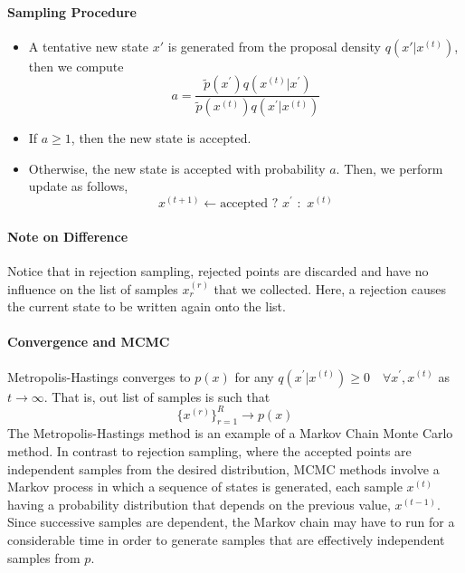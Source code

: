 \documentclass[11pt]{article}
\begin{document}
\paragraph{Sampling Procedure}
\begin{itemize}
    \item A tentative new state $x'$ is generated from the proposal density $q(x'|x^{(t)})$, then we compute
        \begin{equation}
            a=\frac{\tilde{p}\left(x^{\prime}\right) q\left(x^{(t)} | x^{\prime}\right)}{\tilde{p}\left(x^{(t)}\right) q\left(x^{\prime} | x^{(t)}\right)}
        \end{equation}
    \item If $a \geq 1$, then the new state is accepted. 
    \item Otherwise, the new state is accepted with probability $a$. Then, we perform update as follows,
    \begin{equation}
        x^{(t+1)} \gets \text{accepted}\,\,?\,\, x^{\prime} \,\,:\,\,x^{(t)} 
    \end{equation}
\end{itemize}

\paragraph{Note on Difference} Notice that in rejection sampling, rejected points are discarded and have no influence on the list of samples $x^{(r)}_r$ that we collected. Here, a rejection causes the current state to be written again onto the list. 

\paragraph{Convergence and MCMC} Metropolis-Hastings converges to $p(x)$ for any $q\left(x^{\prime} | x^{(t)}\right) \geq 0 \quad \forall x^{\prime}, x^{(t)}$ as $t \rightarrow \infty$. That is, out list of samples is such that
\begin{equation}
    \{x^{(r)}\}_{r=1}^{R} \rightarrow p(x)
\end{equation}
The Metropolis-Hastings method is an example of a Markov Chain Monte Carlo method. In contrast to rejection sampling, where the accepted points are independent samples from the desired distribution, MCMC methods involve a Markov process in which a sequence of states is generated, each sample $x^{(t)}$ having a probability distribution that depends on the previous value, $x^{(t - 1)}$. Since successive samples are dependent, the Markov chain may have to run for a considerable time in order to generate samples that are effectively independent samples from $p$. 
\end{document}
